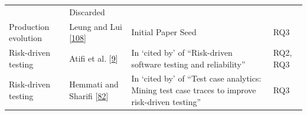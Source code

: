 \documentclass[]{book}
\begin{document}
\begin{longtable}[]{@{}llll@{}}
\begin{minipage}[t]{0.50\columnwidth}
\end{minipage} & \begin{minipage}[t]{0.04\columnwidth}\raggedright\strut
Discarded\strut
\end{minipage}\tabularnewline
\begin{minipage}[t]{0.18\columnwidth}\raggedright\strut
Production evolution\strut
\end{minipage} & \begin{minipage}[t]{0.16\columnwidth}\raggedright\strut
Leung and Lui {[}\protect\hyperlink{ref-leung2015testing}{108}{]}\strut
\end{minipage} & \begin{minipage}[t]{0.50\columnwidth}\raggedright\strut
Initial Paper Seed\strut
\end{minipage} & \begin{minipage}[t]{0.04\columnwidth}\raggedright\strut
RQ3\strut
\end{minipage}\tabularnewline
\begin{minipage}[t]{0.18\columnwidth}\raggedright\strut
Risk-driven testing\strut
\end{minipage} & \begin{minipage}[t]{0.16\columnwidth}\raggedright\strut
Atifi et al. {[}\protect\hyperlink{ref-atifi2017}{9}{]}\strut
\end{minipage} & \begin{minipage}[t]{0.50\columnwidth}\raggedright\strut
In `cited by' of ``Risk-driven software testing and reliability''\strut
\end{minipage} & \begin{minipage}[t]{0.04\columnwidth}\raggedright\strut
RQ2, RQ3\strut
\end{minipage}\tabularnewline
\begin{minipage}[t]{0.18\columnwidth}\raggedright\strut
Risk-driven testing\strut
\end{minipage} & \begin{minipage}[t]{0.16\columnwidth}\raggedright\strut
Hemmati and Sharifi {[}\protect\hyperlink{ref-hemmati2018}{82}{]}\strut
\end{minipage} & \begin{minipage}[t]{0.50\columnwidth}\raggedright\strut
In `cited by' of ``Test case analytics: Mining test case traces to
improve risk-driven testing''\strut
\end{minipage} & \begin{minipage}[t]{0.04\columnwidth}\raggedright\strut
RQ3\strut
\end{minipage}\tabularnewline

\end{longtable}
\end{document}
